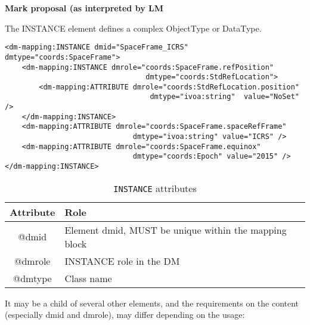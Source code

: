 
\textbf{Mark proposal (as interpreted by LM}

   The INSTANCE element defines a complex ObjectType or DataType.
   
\begin{lstlisting}[frame=single,caption={Example of INSTANCE child of GLOBALS},style=XML,basicstyle=\tiny]
<dm-mapping:INSTANCE dmid="SpaceFrame_ICRS" dmtype="coords:SpaceFrame">
	<dm-mapping:INSTANCE dmrole="coords:SpaceFrame.refPosition"
                                 dmtype="coords:StdRefLocation">
		<dm-mapping:ATTRIBUTE dmrole="coords:StdRefLocation.position" 
		                          dmtype="ivoa:string"  value="NoSet" />
	</dm-mapping:INSTANCE>
	<dm-mapping:ATTRIBUTE dmrole="coords:SpaceFrame.spaceRefFrame" 
	                          dmtype="ivoa:string" value="ICRS" />
	<dm-mapping:ATTRIBUTE dmrole="coords:SpaceFrame.equinox" 
	                          dmtype="coords:Epoch"	value="2015" />
</dm-mapping:INSTANCE>
\end{lstlisting}   
   

\begin{table}[!htbp]
\small
\centering
\begin{tabulary}{\linewidth}{|c|J|}       
       \hline 
            \textbf{Attribute} & 
            \textbf {Role}\\
       \hline         \hline  
            @dmid & 
            Element dmid, MUST be unique within the mapping block  \\
        \hline 
            @dmrole & 
            INSTANCE role in the DM \\
        \hline 
            @dmtype & 
            Class name \\
        \hline 
     \end{tabulary}
     \caption{\texttt{INSTANCE} attributes} 
     \label{tbl:instance-att}
 \end{table}   
    It may be a child of several other elements, and the requirements on
    the content (especially dmid and dmrole), may differ depending on
    the usage:
    
